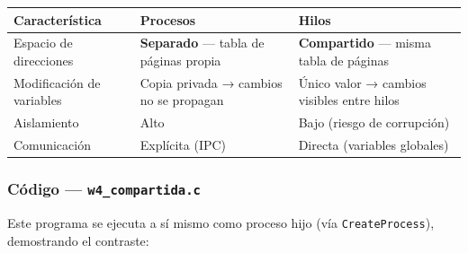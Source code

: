 \documentclass[
  spanish,
]{article}
\newcounter{none} %
\begin{document}
{\def\LTcaptype{none} %
\begin{longtable}[]{@{}
  >{\raggedright\arraybackslash}p{}
  >{\raggedright\arraybackslash}p{}
  >{\raggedright\arraybackslash}p{}@{}}
\toprule\noalign{}
\begin{minipage}[b]{\linewidth}\raggedright
Característica
\end{minipage} & \begin{minipage}[b]{\linewidth}\raggedright
Procesos
\end{minipage} & \begin{minipage}[b]{\linewidth}\raggedright
Hilos
\end{minipage} \\
\midrule\noalign{}
\endhead
\bottomrule\noalign{}
\endlastfoot
Espacio de direcciones & \textbf{Separado} --- tabla de páginas propia &
\textbf{Compartido} --- misma tabla de páginas \\
Modificación de variables & Copia privada → cambios no se propagan &
Único valor → cambios visibles entre hilos \\
Aislamiento & Alto & Bajo (riesgo de corrupción) \\
Comunicación & Explícita (IPC) & Directa (variables globales) \\
\end{longtable}
}

\subsubsection{\texorpdfstring{Código ---
\texttt{w4\_compartida.c}}{Código --- w4\_compartida.c}}\label{cuxf3digo-w4_compartida.c}

Este programa se ejecuta a sí mismo como proceso hijo (vía
\texttt{CreateProcess}), demostrando el contraste:
\end{document}
